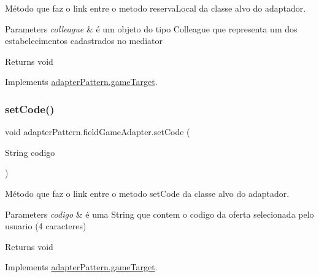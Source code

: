 Método que faz o link entre o metodo reserva\+Local da classe alvo do adaptador. 


\begin{DoxyParams}{Parameters}
{\em colleague} & é um objeto do tipo Colleague que representa um dos estabelecimentos cadastrados no mediator \\
\hline
\end{DoxyParams}
\begin{DoxyReturn}{Returns}
void 
\end{DoxyReturn}


Implements \mbox{\hyperlink{interfaceadapter_pattern_1_1game_target_a663405a3d10988de25c6ea3ef63c68eb}{adapter\+Pattern.\+game\+Target}}.

\mbox{\label{classadapter_pattern_1_1field_game_adapter_a4987c7e6aa3183a1c042f32432f1db8b}} 
\subsubsection{\texorpdfstring{setCode()}{setCode()}}
{\footnotesize\ttfamily void adapter\+Pattern.\+field\+Game\+Adapter.\+set\+Code (\begin{DoxyParamCaption}\item[{String}]{codigo }\end{DoxyParamCaption})}



Método que faz o link entre o metodo set\+Code da classe alvo do adaptador. 


\begin{DoxyParams}{Parameters}
{\em codigo} & é uma String que contem o codigo da oferta selecionada pelo usuario (4 caracteres) \\
\hline
\end{DoxyParams}
\begin{DoxyReturn}{Returns}
void 
\end{DoxyReturn}


Implements \mbox{\hyperlink{interfaceadapter_pattern_1_1game_target_a9ea61c0d011aa457f9a8c887d086044a}{adapter\+Pattern.\+game\+Target}}.

\mbox{\label{classadapter_pattern_1_1field_game_adapter_a1b2122a14b0bab5a09d065da2bd7e4bc}} 
